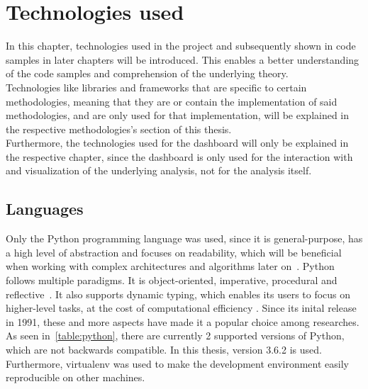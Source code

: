 

\chapter{Technologies used}
\label{ch:technologiesUsed}

In this chapter, technologies used in the project and subsequently shown in code samples in later chapters will be introduced.
This enables a better understanding of the code samples and comprehension of the underlying theory.\\
Technologies like libraries and frameworks that are specific to certain methodologies,
meaning that they are or contain the implementation of said methodologies,
and are only used for that implementation,
will be explained in the respective methodologies's section of this thesis.\\
Furthermore, the technologies used for the dashboard will only be explained in the respective chapter,
since the dashboard is only used for the interaction with and visualization of the underlying analysis,
not for the analysis itself.

\section{Languages}
\label{sec:languages}

Only the Python programming language was used, since it is general-purpose,
has a high level of abstraction and focuses on readability,
which will be beneficial when working with complex architectures and algorithms later on~\cite{pythonDocs}.
Python follows multiple paradigms.
It is object-oriented, imperative, procedural and reflective~\cite{van2007python}.
It also supports dynamic typing, which enables its users to focus on higher-level tasks, at the cost of computational efficiency \cite{Perez-schofield2010}.
Since its inital release in 1991, these and more aspects have made it a popular choice among researches.
As seen in~\ref{table:python}, there are currently 2 supported versions of Python, which are not backwards compatible.
In this thesis, version 3.6.2 is used.
Furthermore, virtualenv was used to make the development environment easily reproducible on other machines.

